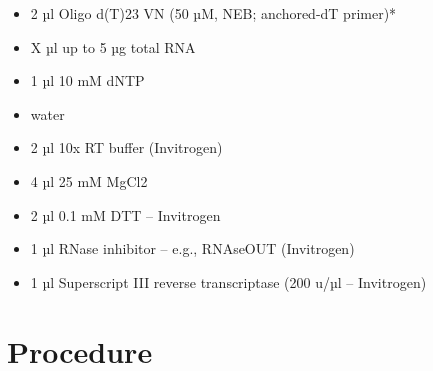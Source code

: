 \documentclass[
  letterpaper,
  DIV=11,
  numbers=noendperiod]{scrreprt}
\providecommand{\tightlist}{%
  \setlength{\itemsep}{0pt}\setlength{\parskip}{0pt}}\usepackage{longtable,booktabs,array}
\begin{document}
\begin{itemize}
\tightlist
\item
  2 µl Oligo d(T)23 VN (50 µM, NEB; anchored-dT primer)*
\item
  X µl up to 5 µg total RNA
\item
  1 µl 10 mM dNTP
\item
  water
\item
  2 µl 10x RT buffer (Invitrogen)
\item
  4 µl 25 mM MgCl2
\item
  2 µl 0.1 mM DTT -- Invitrogen
\item
  1 µl RNase inhibitor -- e.g., RNAseOUT (Invitrogen)
\item
  1 µl Superscript III reverse transcriptase (200 u/µl -- Invitrogen)
\end{itemize}

\hypertarget{procedure-11}{%
\section{Procedure}\label{procedure-11}}
\end{document}

